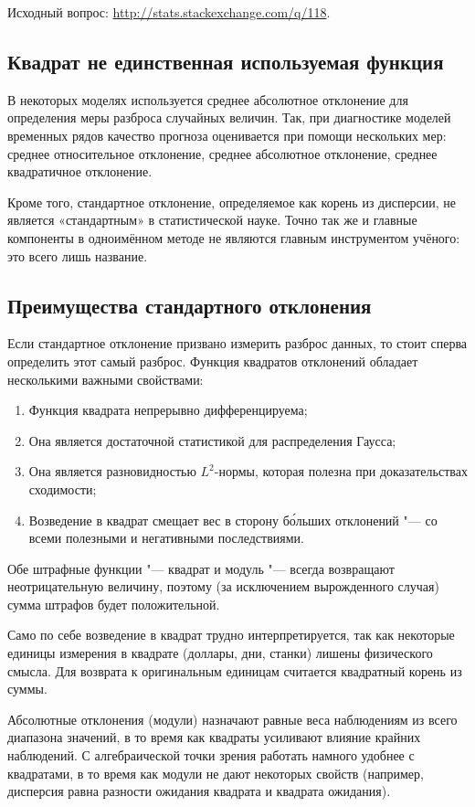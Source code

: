 \documentclass[11pt]{article}
\begin{document}
Исходный вопрос: \url{http://stats.stackexchange.com/q/118}.

\subsection{Квадрат не единственная используемая функция}

В некоторых моделях используется среднее абсолютное отклонение для определения меры разброса случайных величин. Так, при диагностике моделей временных рядов качество прогноза оценивается при помощи нескольких мер: среднее относительное отклонение, среднее абсолютное отклонение, среднее квадратичное отклонение.

Кроме того, стандартное отклонение, определяемое как корень из дисперсии, не является «стандартным» в статистической науке. Точно так же и главные компоненты в одноимённом методе не являются главным инструментом учёного: это всего лишь название.

\subsection{Преимущества стандартного отклонения}

Если стандартное отклонение призвано измерить разброс данных, то стоит сперва определить этот самый разброс. Функция квадратов отклонений обладает несколькими важными свойствами:
\begin{enumerate}
	\item Функция квадрата непрерывно дифференцируема;
	\item Она является достаточной статистикой для распределения Гаусса;
	\item Она является разновидностью $L^2$-нормы, которая полезна при доказательствах сходимости;
	\item Возведение в квадрат смещает вес в сторону б\'{о}льших отклонений "--- со всеми полезными и негативными последствиями.
\end{enumerate}

Обе штрафные функции "--- квадрат и модуль "--- всегда возвращают неотрицательную величину, поэтому (за исключением вырожденного случая) сумма штрафов будет положительной.

Само по себе возведение в квадрат трудно интерпретируется, так как некоторые единицы измерения в квадрате (доллары, дни, станки) лишены физического смысла. Для возврата к оригинальным единицам считается квадратный корень из суммы.

Абсолютные отклонения (модули) назначают равные веса наблюдениям из всего диапазона значений, в то время как квадраты усиливают влияние крайних наблюдений. С алгебраической точки зрения работать намного удобнее с квадратами, в то время как модули не дают некоторых свойств (например, дисперсия равна разности ожидания квадрата и квадрата ожидания). 
\end{document}
